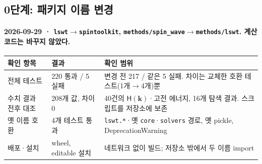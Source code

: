 \subsection{0단계: 패키지 이름 변경}\label{rename-verification}
\begingroup%
  \framesubtitle{2026-09-29 · \texttt{lswt}$\to$\texttt{spintoolkit}, \texttt{methods/spin\_wave}$\to$\texttt{methods/lswt}. 계산 코드는 바꾸지 않았다.}
  \begin{tabularx}{\textwidth}{@{}p{3.4cm}p{3.4cm}Y@{}}
    \toprule
    확인 항목 & 결과 & 확인 범위 \\
    \midrule
    전체 테스트 & 220 통과 / 5 실패 & 변경 전 217 / 같은 5 실패. 차이는 교체한 호환 테스트(1개$\to$4개)뿐 \\
    수치 결과 전후 대조 & 208개 값, 차이 0 & 40건의 $\mathsf H(\mathbf k)$·고전 에너지, 16개 탐색 결과. 스크립트를 저장소에 보존 \\
    옛 이름 호환 & 4개 테스트 통과 & \texttt{lswt.*}·옛 \texttt{core}·\texttt{solvers} 경로, 옛 pickle, DeprecationWarning \\
    배포·설치 & wheel, editable 설치 & 네트워크 없이 빌드; 저장소 밖에서 두 이름 import \\
    \bottomrule
  \end{tabularx}
  \par\medskip
\endgroup


